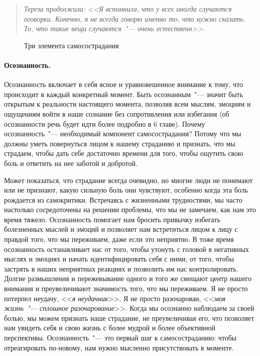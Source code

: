 \begin{quote}
	\textit{Тереза продолжила: <<Я вспомнила, что у всех иногда случаются оговорки. Конечно, я не всегда говорю именно то, что нужно сказать. То, что такие вещи случаются~"--- очень естественн>>.} 
\end{quote}

\begin{figure}[h]
	\begin{center}
		
		\caption{Три элемента самосострадания}
	\end{center}
\end{figure}

\paragraph{Осознанность.} Осознанность включает в себя ясное и уравновешенное внимание к тому, что происходит в каждый конкретный момент. Быть осознанным~"--- значит быть открытым к реальности настоящего момента, позволяя всем мыслям, эмоциям и ощущениям войти в наше сознание без сопротивления или избегания (об осознанности речь будет идти более подробно в 6 главе). 
Почему осознанность~"--- необходимый компонент самосострадания? Потому что мы должны уметь повернуться лицом к нашему страданию и признать, что мы страдаем, чтобы дать себе достаточно времени для того, чтобы ощутить свою боль и ответить на нее заботой и добротой.
 
Может показаться, что страдание всегда очевидно, но многие люди не понимают или не признают, какую сильную боль они чувствуют, особенно когда эта боль рождается из самокритики. Встречаясь с жизненными трудностями, мы часто настолько сосредоточены на решении проблемы, что мы не замечаем, как нам  это время тяжело. Осознанность помогает нам бросить привычку избегать болезненных мыслей и эмоций и позволяет нам встретиться лицом к лицу с правдой того, что мы переживаем, даже если это неприятно. В тоже время осознанность останавливает нас от того, чтобы утонуть с головой в негативных мыслях и эмоциях и начать идентифицировать себя с ними, от того, чтобы застрять в наших неприятных реакциях и позволить им нас контролировать. Долгие размышления и пережевывание одного и того же смещают центр нашего внимания и преувеличивают значимость того, что мы переживаем. Я не просто потерпел неудачу, <<\emph{я неудачник}>>. Я не просто разочарован, <<\emph{моя жизнь~"--- сплошное разочарование}>>. Когда мы осознанно наблюдаем за своей болью, мы можем признать наше страдание, не преувеличивая его, что позволяет нам увидеть себя и свою жизнь с более мудрой и более объективной перспективы. Осознанность~"--- это первый шаг к самосостраданию: чтобы отреагировать по-новому, нам нужно мысленно присутствовать в моменте.
 
